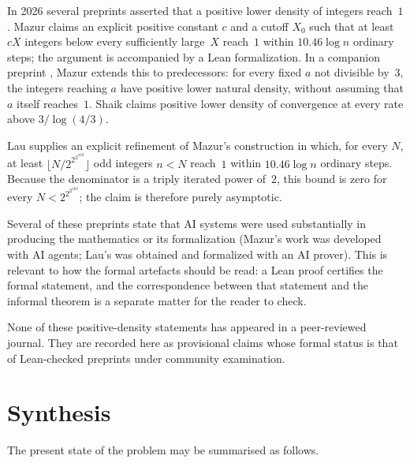 \documentclass[11pt,reqno,oneside]{amsart}
\begin{document}
In 2026 several preprints asserted that a positive lower density of integers reach~$1$. Mazur \cite{MazurPosDens} claims an explicit positive constant $c$ and a cutoff $X_0$ such that at least $cX$ integers below every sufficiently large~$X$ reach~$1$ within $10.46\log n$ ordinary steps; the argument is accompanied by a Lean formalization. In a companion preprint \cite{MazurPred}, Mazur extends this to predecessors: for every fixed $a$ not divisible by~$3$, the integers reaching $a$ have positive lower natural density, without assuming that $a$ itself reaches~$1$. Shaik \cite{ShaikPos} claims positive lower density of convergence at every rate above $3/\log(4/3)$.

Lau \cite{Lau26} supplies an explicit refinement of Mazur's construction in which, for every $N$, at least $\lfloor N/2^{2^{2^{163}}}\rfloor$ odd integers $n<N$ reach~$1$ within $10.46\log n$ ordinary steps. Because the denominator is a triply iterated power of~$2$, this bound is zero for every $N<2^{2^{2^{163}}}$; the claim is therefore purely asymptotic.

Several of these preprints state that AI systems were used substantially in producing the mathematics or its formalization (Mazur's work was developed with AI agents; Lau's was obtained and formalized with an AI prover). This is relevant to how the formal artefacts should be read: a Lean proof certifies the formal statement, and the correspondence between that statement and the informal theorem is a separate matter for the reader to check.

None of these positive-density statements has appeared in a peer-reviewed journal. They are recorded here as provisional claims whose formal status is that of Lean-checked preprints under community examination.

\section{Synthesis}

The present state of the problem may be summarised as follows.
\end{document}
